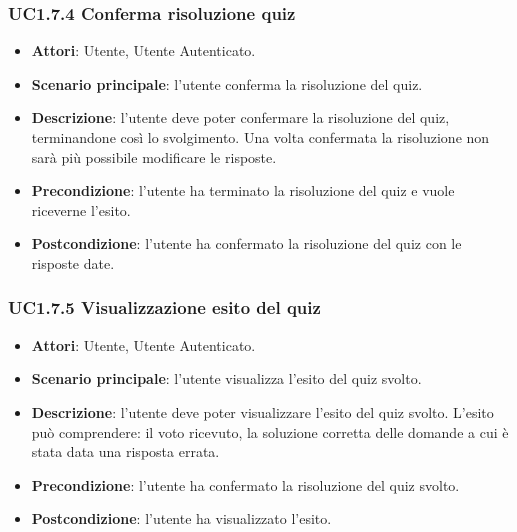 \subsubsection{UC1.7.4 Conferma risoluzione quiz}
\begin{itemize}
\item \textbf{Attori}: Utente, Utente Autenticato.
\item \textbf{Scenario principale}: l'utente conferma la risoluzione del quiz.
\item \textbf{Descrizione}: l'utente deve poter confermare la risoluzione del quiz, terminandone così lo svolgimento. Una volta confermata la risoluzione non sarà più possibile modificare le risposte.
\item \textbf{Precondizione}:  l'utente ha terminato la risoluzione del quiz e vuole riceverne l'esito.
\item \textbf{Postcondizione}: l'utente ha confermato la risoluzione del quiz con le risposte date.
\end{itemize}
\subsubsection{UC1.7.5 Visualizzazione esito del quiz}
\begin{itemize}
\item \textbf{Attori}: Utente, Utente Autenticato.
\item \textbf{Scenario principale}: l'utente visualizza l'esito del quiz svolto.
\item \textbf{Descrizione}: l'utente deve poter visualizzare l'esito del quiz svolto. L'esito può comprendere: il voto ricevuto, la soluzione corretta delle domande a cui è stata data una risposta errata.
\item \textbf{Precondizione}: l'utente ha confermato la risoluzione del quiz svolto.
\item \textbf{Postcondizione}: l'utente ha visualizzato l'esito.
\end{itemize}
